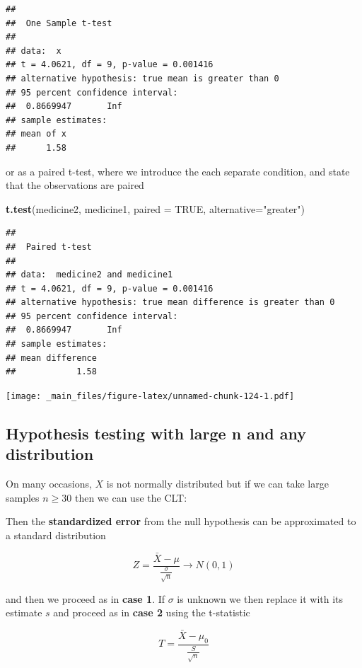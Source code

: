 \documentclass[
]{book}
\newenvironment{Shaded}{\begin{snugshade}}{\end{snugshade}}
\newcommand{\AttributeTok}[1]{\textcolor[rgb]{0.13,0.29,0.53}{#1}}
\newcommand{\ConstantTok}[1]{\textcolor[rgb]{0.56,0.35,0.01}{#1}}
\newcommand{\FunctionTok}[1]{\textcolor[rgb]{0.13,0.29,0.53}{\textbf{#1}}}
\newcommand{\NormalTok}[1]{#1}
\newcommand{\StringTok}[1]{\textcolor[rgb]{0.31,0.60,0.02}{#1}}
\begin{document}
\begin{verbatim}
## 
##  One Sample t-test
## 
## data:  x
## t = 4.0621, df = 9, p-value = 0.001416
## alternative hypothesis: true mean is greater than 0
## 95 percent confidence interval:
##  0.8669947       Inf
## sample estimates:
## mean of x 
##      1.58
\end{verbatim}

or as a paired t-test, where we introduce the each separate condition, and state that the observations are paired

\begin{Shaded}
\begin{Highlighting}[]
\FunctionTok{t.test}\NormalTok{(medicine2, medicine1,}
       \AttributeTok{paired =} \ConstantTok{TRUE}\NormalTok{,}
       \AttributeTok{alternative=}\StringTok{"greater"}\NormalTok{)}
\end{Highlighting}
\end{Shaded}

\begin{verbatim}
## 
##  Paired t-test
## 
## data:  medicine2 and medicine1
## t = 4.0621, df = 9, p-value = 0.001416
## alternative hypothesis: true mean difference is greater than 0
## 95 percent confidence interval:
##  0.8669947       Inf
## sample estimates:
## mean difference 
##            1.58
\end{verbatim}

\texttt{[image: \_main\_files/figure-latex/unnamed-chunk-124-1.pdf]}

\hypertarget{hypothesis-testing-with-large-n-and-any-distribution}{%
\subsection{Hypothesis testing with large n and any distribution}\label{hypothesis-testing-with-large-n-and-any-distribution}}

On many occasions, \(X\) is not normally distributed but if we can take large samples \(n \ge 30\) then we can use the CLT:

Then the \textbf{standardized error} from the null hypothesis can be approximated to a standard distribution

\[Z=\frac{\bar{X}-\mu}{\frac{\sigma}{\sqrt{n}}}  \rightarrow N(0,1)\]

and then we proceed as in \textbf{case 1}. If \(\sigma\) is unknown we then replace it with its estimate \(s\) and proceed as in \textbf{case 2} using the t-statistic

\[T=\frac{\bar{X}-\mu_0}{\frac{S}{\sqrt{n}}}\]
\end{document}
